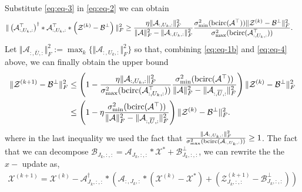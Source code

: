 \documentclass[aspectratio=169]{beamer}
\def\bcirc{{\rm bcirc}}
\def\fm#1{\mathcal{#1}}
\def\m#1{\boldsymbol{#1}}
\def\b{\beta}
\def \ai#1{\m A_{I_{#1}, :}}
\def\fm#1{\mathcal{#1}}
\def\m#1{\boldsymbol{#1}}
\def\b{\beta}
\def \a#1{\fm A_{:, #1, :}}
\def \b#1{\fm B_{#1, :, :}}
\def \ai#1{\fm A_{#1, :, :}}
\def \z#1#2{\fm Z^{(#1)}_{#2, :, :}}
\def \bp#1{\fm B^{\perp}_{#1, :, :}}
\def \x#1{\fm X^{(#1)}}
\begin{document}
\begin{frame}{}
 Substitute \eqref{eq:eq-3} in \eqref{eq:eq-2} we can obtain
\begin{align}
     \Vert \left(\a{U_k}^\top \right)^\dagger * \a{U_k}^\top *\left(\fm Z^{(k)}-\fm B^\perp \right) \Vert_F^2 & \geq \frac{\eta \Vert \a{U_k} \Vert_F^2}{\Vert \fm A \Vert_F^2 - \Vert \a{U_k} \Vert_F^2} \frac{\sigma_{\min}^2(\bcirc(\fm A^\top)) \Vert \fm Z^{(k)}-\fm B^\perp \Vert_F^2}{\sigma_{\max}^2(\bcirc(\a{U_k}^\top))}. \label{eq:eq-4}
\end{align}
Let $\Vert \a{\overline{U}} \Vert_F^2 := \max_k \{ \Vert \a{U_k}\Vert_F^2\}$ so that, combining \eqref{eq:eq-1b} and  \eqref{eq:eq-4} above, we can finally obtain the upper bound
\begin{align}
     \Vert   \fm Z^{(k+1)} - \fm B^\perp  \Vert_F^2  & \leq  \left( 1 - \frac{\eta \Vert \a{U_k} \Vert_F^2}{ \sigma_{\max}^2(\bcirc(\a{U_k}^\top)) } \frac{\sigma_{\min}^2(\bcirc(\fm A^\top))}{\Vert \fm A \Vert_F^2 - \Vert \a{\overline{U}} \Vert_F^2}   \right) \Vert  \fm Z^{(k)} - \fm B^\perp \Vert_F^2  \notag \\
     & \leq \left( 1 - \eta  \frac{\sigma_{\min}^2(\bcirc(\fm A^\top))}{\Vert \fm A \Vert_F^2 - \Vert \a{\overline{U}} \Vert_F^2}   \right) \Vert  \fm Z^{(k)} - \fm B^\perp \Vert_F^2 .
\end{align}
where  in the last inequality we used the fact that $\frac{\Vert \a{U_k}\Vert_F^2 }{\sigma_{\max}^2(\bcirc(\a{U_k}))}\geq 1$. The fact that  we can decompose $\b{J_k} = \ai{J_k}*\fm X^\ast + \bp{J_k} $, we can rewrite the the $x-$ update as,
\begin{align*}
   \fm X^{(k+1)} = \x k - \ai{J_k}^\dagger * \left( \a{J_k} *\left(\x k - \fm X^\ast \right) + \left(\z{k+1}{J_k} - \bp{J_k}  \right)\right)
\end{align*}   
\end{frame}
\end{document}
